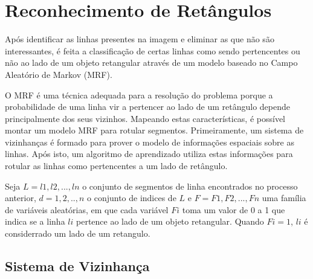 

\section{Reconhecimento de Retângulos}

Após identificar as linhas presentes na imagem e eliminar as que não são interessantes, é feita a classificação de certas linhas como sendo pertencentes ou não ao lado de um objeto retangular através de um modelo baseado no Campo Aleatório de Markov (MRF).

O MRF é uma técnica adequada para a resolução do problema porque a probabilidade de uma linha vir a pertencer ao lado de um retângulo depende principalmente dos seus vizinhos. Mapeando estas características, é possível montar um modelo MRF para rotular segmentos. Primeiramente, um sistema de vizinhanças é formado para prover o modelo de informações espaciais sobre as linhas. Após isto, um algoritmo de aprendizado utiliza estas informações para rotular as linhas como pertencentes a um lado de retângulo.

Seja $L = {l1,l2,...,ln}$ o conjunto de segmentos de linha encontrados no processo anterior, $d = {1,2,..,n}$ o conjunto de indices de $L$ e $F = {F1,F2,...,Fn}$ uma família de variáveis aleatórias, em que cada variável $Fi$ toma um valor de 0 a 1 que indica se a linha $li$ pertence ao lado de um objeto retangular. Quando $Fi = 1$, $li$ é considerrado um lado de um retangulo.

\subsection{Sistema de Vizinhança}


